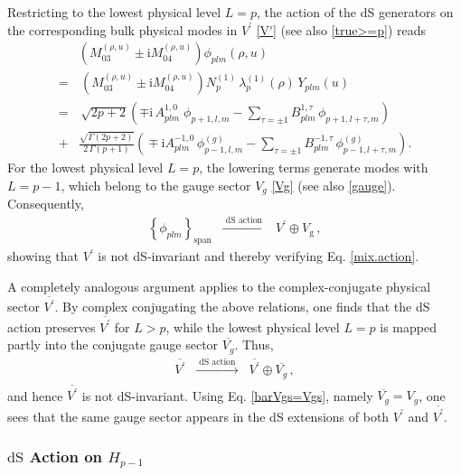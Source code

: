 \documentclass[aps,twocolumn,nofootinbib]{revtex4}
\begin{document}
{\begin{appendix}
Restricting to the lowest physical level $L=p$, the action of the dS generators on the corresponding bulk physical modes in $V^\prime$ \eqref{V'} (see also \eqref{true>=p}) reads
\begin{align}
    &\!\!\!\!\!\!\!\left(M_{03}^{(\rho, u)} \pm \mathrm{i}M_{04}^{(\rho, u)}\right) \phi^{}_{plm}(\rho,u) \nonumber\\[3pt]
    =&\, \left(M_{03}^{(\rho, u)} \pm \mathrm{i} M_{04}^{(\rho, u)}\right) N^{(1)}_{p}\, \lambda_{p}^{(1)}(\rho)\, Y^{}_{plm}(u) \nonumber\\[3pt]
    =&\, \sqrt{2p+2} \left(\mp\mathrm{i} \, A^{1,0}_{plm} \;\phi^{}_{p+1,l,m} - \sum_{\tau=\pm1} B^{1,\tau}_{plm} \, \phi^{}_{p+1,l+\tau,m}\right) \nonumber\\[3pt]
    +& \frac{\sqrt{\Gamma(2p+2)}}{2\, \Gamma(p+1)} \! \left(\!\mp \mathrm{i} A^{-1,0}_{plm}\, \phi^{(g)}_{p-1,l,m} - \!\!\sum_{\tau=\pm1}\!\! B^{-1,\tau}_{plm}\, \phi^{(g)}_{p-1,l+\tau,m} \right) .
\end{align}
For the lowest physical level $L=p$, the lowering terms generate modes with $L=p-1$, which belong to the gauge sector $V_g$ \eqref{Vg} (see also \eqref{gauge}). Consequently,
\begin{align}
    \left\{\phi^{}_{plm}\right\}_{\mathrm{span}} \;\;\xrightarrow[]{\text{ dS action }}\;\; V^\prime\oplus V_{\mathrm{g}} \,,
\end{align}
showing that $V^\prime$ is not dS-invariant and thereby verifying Eq. \eqref{mix.action}.

A completely analogous argument applies to the complex-conjugate physical sector $\overline{V^\prime}$. By complex conjugating the above relations, one finds that the dS action preserves $\overline{V^\prime}$ for $L>p$, while the lowest physical level $L=p$ is mapped partly into the conjugate gauge sector $\overline{V_g}$. Thus,
\begin{align}
    \overline{V^\prime} \;\;\xrightarrow[]{\text{ dS action }}\;\; \overline{V^\prime}\oplus \overline{V_g} \,,
\end{align}
and hence $\overline{V^\prime}$ is not dS-invariant. Using Eq. \eqref{barVgs=Vgs}, namely $\overline{V_g}=V_g$, one sees that the same gauge sector appears in the dS extensions of both $V^\prime$ and $\overline{V^\prime}$.


\subsubsection{$\mathrm{dS}$ Action on $H_{p-1}$} 


\end{appendix}}
\end{document}
